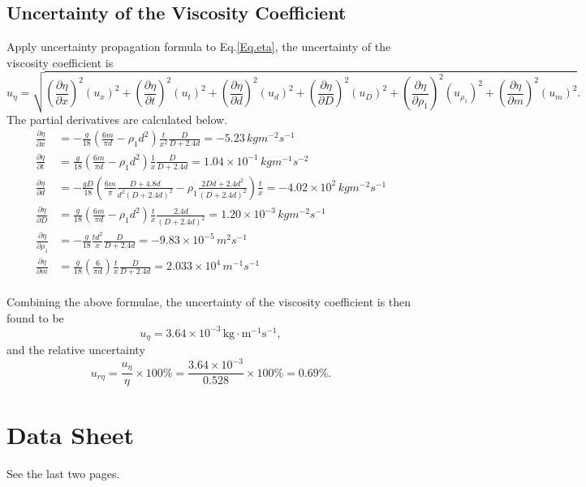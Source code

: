 \documentclass[a4paper]{article}
\begin{document}
	\subsection{Uncertainty of the Viscosity Coefficient}
Apply uncertainty propagation formula to Eq.\eqref{Eq.eta}, the uncertainty of the viscosity coefficient is
$$ u_\eta=\sqrt{(\frac{\partial \eta}{\partial x})^2(u_x)^2 + (\frac{\partial \eta}{\partial t})^2(u_t)^2 + (\frac{\partial \eta}{\partial d})^2(u_d)^2 + (\frac{\partial \eta}{\partial D})^2(u_D)^2 + (\frac{\partial \eta}{\partial \rho_1})^2(u_{\rho_1})^2 + (\frac{\partial \eta}{\partial m})^2(u_m)^2}.$$
The partial derivatives are calculated below.
\begin{align*}
\frac{\partial \eta}{\partial x} &= -\frac{g}{18}(\frac{6m}{\pi d}-\rho_1 d^2)\frac{t}{x^2}\frac{D}{D+2.4d} = -5.23\, kg  m^{-2} s^{-1}\\
\frac{\partial \eta}{\partial t} &= \frac{g}{18}(\frac{6m}{\pi d}-\rho_1 d^2)\frac{1}{x}\frac{D}{D+2.4d} = 1.04\times10^{-1}\, kg  m^{-1} s^{-2}\\
\frac{\partial \eta}{\partial d} &= -\frac{gD}{18}(\frac{6m}{\pi}\frac{D+4.8d}{d^2(D+2.4d)^2}-\rho_1\frac{2Dd+2.4d^2}{(D+2.4d)^2})\frac{t}{x} = -4.02 \times 10^{2} \, kg m^{-2} s^{-1}\\
\frac{\partial \eta}{\partial D} &= \frac{g}{18}(\frac{6m}{\pi d}-\rho_1 d^2)\frac{t}{x} \frac{2.4d}{(D+2.4d)^2} = 1.20\times 10^{-3}\, kg  m^{-2} s^{-1}\\
\frac{\partial \eta}{\partial \rho_1} &= -\frac{g}{18}\frac{td^2}{x} \frac{D}{D+2.4d} = -9.83\times 10^{-5}\, m^2 s^{-1}\\
\frac{\partial \eta}{\partial m} &= \frac{g}{18}(\frac{6}{\pi d})\frac{t}{x} \frac{D}{D+2.4d} = 2.033\times 10^4\, m^{-1}s^{-1}\\
\end{align*}

Combining the above formulae, the uncertainty of the viscosity coefficient is then found to be
$$u_{\eta} = 3.64\times10^{-3} \,\text{kg}\cdot\text{m}^{-1}\text{s}^{-1},$$
and the relative uncertainty 
$$u_{r\eta} = \frac{u_\eta}{\eta}\times 100\% = \frac{3.64\times 10^{-3}}{0.528} \times 100 \% = 0.69 \%.$$

		\section{Data Sheet}
See the last two pages.


\end{document}
